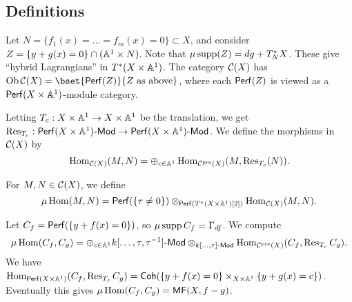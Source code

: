 \documentclass{article}
\begin{document}
\subsection{Definitions}

Let $N = \{ f_1(x) = \dots = f_m(x) = 0 \} \subset X$, and consider $Z = \{y + g(x) = 0\} \cap (\AA^1 \times N)$.
Note that $\mu\supp(Z) = dg + T^*_N X$.
These give ``hybrid Lagrangians'' in $T^*(X \times \AA^1)$.
The category $\Cc(X)$ has $\Ob \Cc(X) = \bset{\Perf(Z)}{Z \textrm{ as above}}$, where each $\Perf(Z)$ is viewed as a $\Perf(X \times \AA^1)$-module category.

Letting $T_c: X \times \AA^1 \to X \times \AA^1$ be the translation, we get $\Res_{T_c}: \Perf(X \times \AA^1)\dMod \to \Perf(X \times \AA^1)\dMod$.
We define the morphisms in $\Cc(X)$ by
\[
	\Hom_{\Cc(X)}(M, N) = \oplus_{c \in \AA^1} \Hom_{\Cc^\pre(X)}(M, \Res_{T_c}(N)).
\]

For $M, N \in \Cc(X)$, we define
\[
	\mu\Hom(M, N) = \Perf(\{\tau \neq 0\}) \otimes_{\Perf(T^*(X \times \AA^1)[2])} \Hom_{\Cc(X)}(M, N).
\]

\begin{ex}
	Let $C_f = \Perf(\{ y + f(x) = 0\})$, so $\mu\supp C_f = \Gamma_{df}$.
	We compute	
	\[
		\mu\Hom(C_f, C_g) = \oplus_{c \in \AA^1} k[\dots, \tau, \tau\inv]\dMod \otimes_{k[\dots, \tau]\dMod} \Hom_{\Cc^\pre(X)}(C_f, \Res_{T_c} C_g).
	\]
	We have $\Hom_{\Perf(X \times \AA^1)}(C_f, \Res_{T_c} C_g) = \Coh(\{y + f(x) = 0\} \times_{X \times \AA^1} \{y + g(x) = c\})$.
	Eventually this gives $\mu\Hom(C_f, C_g) = \MF(X, f - g)$.
\end{ex}
\end{document}
